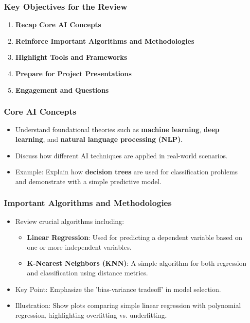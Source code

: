\documentclass[aspectratio=169]{beamer}
\begin{document}
\begin{frame}
    \frametitle{Key Objectives for the Review}
    \begin{enumerate}
        \item \textbf{Recap Core AI Concepts}
        \item \textbf{Reinforce Important Algorithms and Methodologies}
        \item \textbf{Highlight Tools and Frameworks}
        \item \textbf{Prepare for Project Presentations}
        \item \textbf{Engagement and Questions}
    \end{enumerate}
\end{frame}

\begin{frame}
    \frametitle{Core AI Concepts}
    \begin{itemize}
        \item Understand foundational theories such as \textbf{machine learning}, \textbf{deep learning}, and \textbf{natural language processing (NLP)}.
        \item Discuss how different AI techniques are applied in real-world scenarios.
        \item Example: Explain how \textbf{decision trees} are used for classification problems and demonstrate with a simple predictive model.
    \end{itemize}
\end{frame}

\begin{frame}
    \frametitle{Important Algorithms and Methodologies}
    \begin{itemize}
        \item Review crucial algorithms including:
        \begin{itemize}
            \item \textbf{Linear Regression}: Used for predicting a dependent variable based on one or more independent variables.
            \item \textbf{K-Nearest Neighbors (KNN)}: A simple algorithm for both regression and classification using distance metrics.
        \end{itemize}
        \item Key Point: Emphasize the 'bias-variance tradeoff' in model selection.
        \item Illustration: Show plots comparing simple linear regression with polynomial regression, highlighting overfitting vs. underfitting.
    \end{itemize}
\end{frame}
\end{document}
